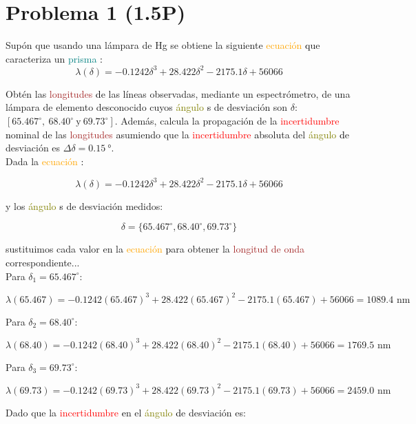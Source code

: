 \documentclass{article}
\begin{document}
\section*{Problema 1 (1.5P)}
Supón que usando una lámpara de Hg se obtiene la siguiente \textcolor{orange}{ ecuación }\textcolor{black} que caracteriza un \textcolor{teal}{ prisma }\textcolor{black}:  
\[
\lambda(\delta) = -0.1242 \delta^3 + 28.422 \delta^2 - 2175.1 \delta + 56066
\]  

Obtén las \textcolor{brown}{ longitudes }\textcolor{black} de las líneas observadas, mediante un espectrómetro, de una lámpara de elemento desconocido cuyos \textcolor{olive}{ ángulo }\textcolor{black}s de desviación son \(\delta\): \([65.467^\circ,\ 68.40^\circ\ \text{y}\ 69.73^\circ]\). Además, calcula la propagación de la \textcolor{red}{ incertidumbre }\textcolor{black} nominal de las \textcolor{brown}{ longitudes }\textcolor{black} asumiendo que la \textcolor{red}{ incertidumbre }\textcolor{black} absoluta del \textcolor{olive}{ ángulo }\textcolor{black} de desviación es \(\Delta\delta = \SI{0.15}{\degree}\). \\

Dada la \textcolor{orange}{ ecuación }\textcolor{black}:

\[
\lambda(\delta) = -0.1242 \delta^3 + 28.422 \delta^2 - 2175.1 \delta + 56066
\]

y los \textcolor{olive}{ ángulo }\textcolor{black}s de desviación medidos:

\[
\delta = \{65.467^\circ, 68.40^\circ, 69.73^\circ\}
\]

sustituimos cada valor en la \textcolor{orange}{ ecuación }\textcolor{black} para obtener la \textcolor{brown}{ longitud de onda }\textcolor{black} correspondiente...\\
Para \(\delta_1 = 65.467^\circ\):

\[
\lambda(65.467) = -0.1242 (65.467)^3 + 28.422 (65.467)^2 - 2175.1 (65.467) + 56066 = 1089.4 \text{ nm}
\]

Para \(\delta_2 = 68.40^\circ\):

\[
\lambda(68.40) = -0.1242 (68.40)^3 + 28.422 (68.40)^2 - 2175.1 (68.40) + 56066 = 1769.5 \text{ nm}
\]


Para \(\delta_3 = 69.73^\circ\):

\[
\lambda(69.73) = -0.1242 (69.73)^3 + 28.422 (69.73)^2 - 2175.1 (69.73) + 56066 = 2459.0 \text{ nm}
\]

Dado que la \textcolor{red}{ incertidumbre }\textcolor{black} en el \textcolor{olive}{ ángulo }\textcolor{black} de desviación es:
\end{document}
